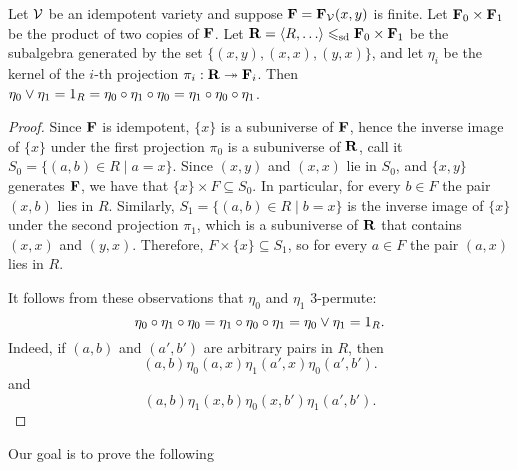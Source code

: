 \begin{lemma}
  \label{lem:absorpt-theor-bk}
  Let $\mathcal{V}$ be an idempotent variety and suppose
  $\mathbf{F} = \mathbf{F}_{\mathcal{V}}(x,y)$ is finite.
  Let $\mathbf{F}_0 \times \mathbf{F}_1$ be the product of two copies of $\mathbf{F}$.
  Let $\bR = \<R, \dots\>  \sdp \bF_0 \times \bF_1$ be the subalgebra generated
  by the set $\{(x, y), (x, x), (y, x)\}$, and let $\eta_i$ be the kernel of the
  $i$-th projection $\pi_i: \mathbf{R} \twoheadrightarrow \mathbf{F}_i$.  Then 
  $\eta_0 \vee \eta_1 = 1_R = \eta_0 \circ \eta_1 \circ \eta_0 = 
  \eta_1 \circ \eta_0 \circ \eta_1$.
\end{lemma}
\begin{proof}
  Since $\mathbf{F}$ is idempotent, $\{x\}$ is a subuniverse of $\mathbf{F}$, hence the inverse
  image of $\{x\}$ under the first projection $\pi_0$ is a subuniverse of $\mathbf{R}$,
  call it $S_0 = \{(a,b) \in R \mid a = x\}$.
  Since $(x,y)$ and $(x,x)$ lie in $S_0$, and $\{x,y\}$
  generates $\mathbf{F}$, we have that $\{x\}\times F \subseteq S_0$.
  In particular, for every $b \in F$ the pair $(x,b)$ lies in $R$.
  Similarly, 
  $S_1= \{(a,b) \in R \mid b = x\}$ is
  the inverse image of $\{x\}$ under the second
  projection $\pi_1$, which is a subuniverse of $\mathbf{R}$
  that contains $(x,x)$ and $(y,x)$. Therefore, $F\times \{x\} \subseteq S_1$, 
  so for every $a\in F$ the pair $(a,x)$ lies in $R$.

  It follows from these observations that $\eta_0$ and $\eta_1$ 3-permute:
  \[
  \eta_0 \circ \eta_1 \circ \eta_0 = 
  \eta_1 \circ \eta_0 \circ \eta_1 =
  \eta_0 \vee \eta_1 = 1_R.
  \]
  Indeed, if $(a,b)$ and $(a',b')$ are arbitrary pairs in $R$, then
  \[
  (a,b) \mathrel{\eta_0} (a,x) \mathrel{\eta_1} (a',x) \mathrel{\eta_0} (a',b').
  \]
  and
  \[
  (a,b) \mathrel{\eta_1} (x,b) \mathrel{\eta_0} (x,b') \mathrel{\eta_1} (a',b').
  \]
\end{proof}

Our goal is to prove the following

